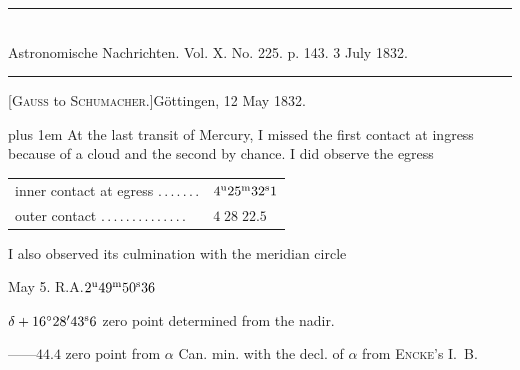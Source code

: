 \clearpage
{}
\begin{center}
\rule{0.55\linewidth}{0.4pt}\\[2pt]
Astronomische Nachrichten. Vol. X. No. 225. p. 143. 3 July 1832.\\[2pt]
\rule{0.55\linewidth}{0.4pt}
\end{center}

\begin{center}[\textsc{Gauss} to \textsc{Schumacher.}]\quad Göttingen, 12 May 1832.\end{center}

{\rightskip=0pt plus 1em At the last transit of Mercury, I missed the first contact at ingress because of a cloud and the second by chance. I did observe the egress\par}

\begin{center}
\begin{tabular}{ll}
inner contact at egress \mbox{.\,.\,.\,.\,.\,.\,.} & $4^{\rm u}25^{\rm m}32^{\rm s}1$ \\
outer contact \mbox{.\,.\,.\,.\,.\,.\,.\,.\,.\,.\,.\,.\,.\,.} & $4\;28\;22.5$ \\
\end{tabular}
\end{center}

I also observed its culmination with the meridian circle

\medskip
\noindent May 5. R.A.\quad $2^{\rm u}49^{\rm m}50^{\rm s}36$\par
\noindent $\delta+16^\circ28'43^{\rm s}6$ zero point determined from the nadir.\par
\noindent\hspace*{1em}---\quad ---\quad $44.4$ zero point from $\alpha$ Can. min. with the decl. of $\alpha$ from \textsc{Encke}’s \mbox{I. B.}

